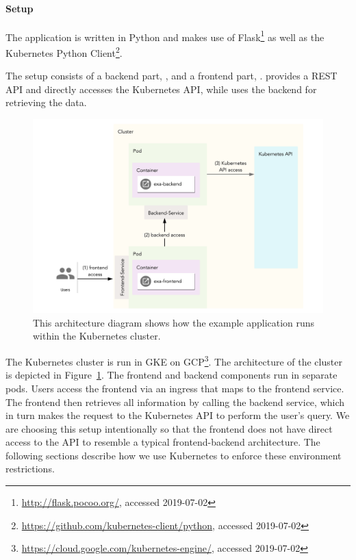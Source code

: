 \paragraph{Setup}

The application is written in Python and makes use of Flask\footnote{\url{http://flask.pocoo.org/}, accessed 2019-07-02} as well as the Kubernetes Python Client\footnote{\url{https://github.com/kubernetes-client/python}, accessed 2019-07-02}. 

The setup consists of a backend part, , and a frontend part, .  provides a REST API and directly accesses the Kubernetes API, while  uses the backend for retrieving the data. 

\begin{figure}[H]
\begin{center}
    \includegraphics[width=1.0\linewidth]{figures/exa_architecture.pdf}
    \caption[Architecture of the example application]{This architecture diagram shows how the example application runs within the Kubernetes cluster.}
    \label{fig:exaArchitecture}
\end{center}
\end{figure}

The Kubernetes cluster is run in \ac{GKE} on \ac{GCP}\footnote{\url{https://cloud.google.com/kubernetes-engine/}, accessed 2019-07-02}. The architecture of the cluster is depicted in Figure~\ref{fig:exaArchitecture}. The frontend and backend components run in separate pods. Users access the frontend via an ingress that maps to the frontend service. The frontend then retrieves all information by calling the backend service, which in turn makes the request to the Kubernetes API to perform the user's query. We are choosing this setup intentionally so that the frontend does not have direct access to the API to resemble a typical frontend-backend architecture. The following sections describe how we use Kubernetes to enforce these environment restrictions.

